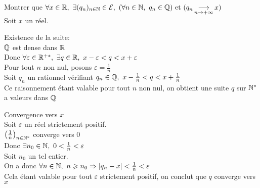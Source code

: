 \documentclass[12pt,twoside,a4paper]{article}
\begin{document}
		\begin{preuve}
			Montrer que $\forall x\in\R,\ \exists (q_n)_{n\in\N}\in\mathcal{E},\ (\forall n\in\N,\ q_n\in\mathbb{Q})\et(q_n\mathop{\longrightarrow}\limits_{n\rightarrow+\infty}x)$\\
			Soit $x$ un réel.
			\begin{liste}
				\item Existence de la suite:\\
					$\mathbb{Q}$ est dense dans $\mathbb{R}$\\
					Donc $\forall \varepsilon\in\mathbb{R}^{+*},\ \exists q\in\mathbb{R},\ x-\varepsilon<q<x+\varepsilon$\\
					Pour tout $n$ non nul, posons $\varepsilon=\frac1{n}$\\
					Soit $q_n$ un rationnel vérifiant $q_n\in\Q,\ x-\frac1{n}<q<x+\frac1{n}$\\
					Ce raisonnement étant valable pour tout $n$ non nul, on obtient une suite $q$ sur $\mathbb{N}^*$ a valeurs dans $\mathbb{Q}$
				\item Convergence vers $x$\\
					Soit $\varepsilon$ un réel strictement positif.\\
					$\left(\frac1{n} \right)_{n\in\mathbb{N}^*}$ converge vers $0$\\
					Donc $\exists n_0\in\N,\ 0<\frac1{n}<\varepsilon$\\
					Soit $n_0$ un tel entier.\\
					On a donc $\forall n\in\mathbb{N},\ n\geqslant n_0\Rightarrow |q_n-x|<\frac1{n}<\varepsilon$\\
					Cela étant valable pour tout $\varepsilon$ strictement positif, on conclut que $q$ converge vers $x$
			\end{liste}
		\end{preuve}
\end{document}
